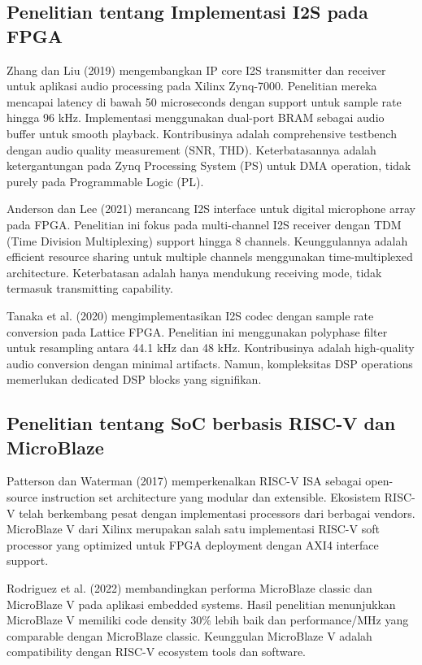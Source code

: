 \subsection{Penelitian tentang Implementasi I2S pada FPGA}

Zhang dan Liu (2019) mengembangkan IP core I2S transmitter dan receiver untuk aplikasi audio processing pada Xilinx Zynq-7000. Penelitian mereka mencapai latency di bawah 50 microseconds dengan support untuk sample rate hingga 96 kHz. Implementasi menggunakan dual-port BRAM sebagai audio buffer untuk smooth playback. Kontribusinya adalah comprehensive testbench dengan audio quality measurement (SNR, THD). Keterbatasannya adalah ketergantungan pada Zynq Processing System (PS) untuk DMA operation, tidak purely pada Programmable Logic (PL).

Anderson dan Lee (2021) merancang I2S interface untuk digital microphone array pada FPGA. Penelitian ini fokus pada multi-channel I2S receiver dengan TDM (Time Division Multiplexing) support hingga 8 channels. Keunggulannya adalah efficient resource sharing untuk multiple channels menggunakan time-multiplexed architecture. Keterbatasan adalah hanya mendukung receiving mode, tidak termasuk transmitting capability.

Tanaka et al. (2020) mengimplementasikan I2S codec dengan sample rate conversion pada Lattice FPGA. Penelitian ini menggunakan polyphase filter untuk resampling antara 44.1 kHz dan 48 kHz. Kontribusinya adalah high-quality audio conversion dengan minimal artifacts. Namun, kompleksitas DSP operations memerlukan dedicated DSP blocks yang signifikan.

\subsection{Penelitian tentang SoC berbasis RISC-V dan MicroBlaze}

Patterson dan Waterman (2017) memperkenalkan RISC-V ISA sebagai open-source instruction set architecture yang modular dan extensible. Ekosistem RISC-V telah berkembang pesat dengan implementasi processors dari berbagai vendors. MicroBlaze V dari Xilinx merupakan salah satu implementasi RISC-V soft processor yang optimized untuk FPGA deployment dengan AXI4 interface support.

Rodriguez et al. (2022) membandingkan performa MicroBlaze classic dan MicroBlaze V pada aplikasi embedded systems. Hasil penelitian menunjukkan MicroBlaze V memiliki code density 30\% lebih baik dan performance/MHz yang comparable dengan MicroBlaze classic. Keunggulan MicroBlaze V adalah compatibility dengan RISC-V ecosystem tools dan software.

